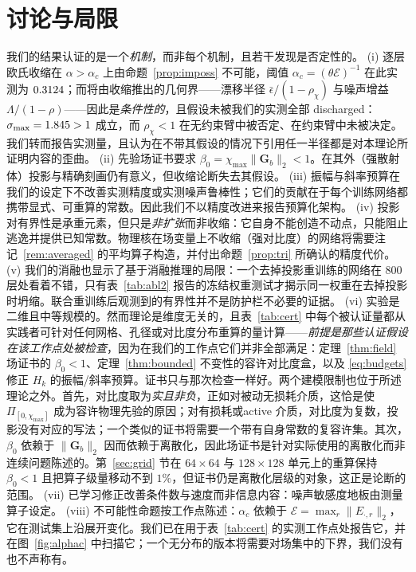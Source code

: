 \documentclass[UTF8,a4paper,11pt]{ctexart}
\newcommand{\norm}[1]{\lVert #1 \rVert}
\newcommand{\numv}[1]{#1}
\begin{document}
\section{讨论与局限}\label{sec:lim}
我们的结果认证的是一个\emph{机制}，而非每个机制，且若干发现是否定性的。
(i) 逐层欧氏收缩在 $\alpha>\alpha_c$ 上由命题~\ref{prop:imposs} 不可能，阈值 $\alpha_c=(\theta\mathcal{E})^{-1}$ 在此实测为 $\numv{\NumAlphaC}$；而将由收缩推出的几何界——漂移半径 $\bar\epsilon/(1-\rho_\chi)$ 与噪声增益 $\Lambda/(1-\rho)$——因此是\emph{条件性的}，且假设未被我们的实测全部 discharged：$\sigma_{\max}=\numv{\NumPhysSigma}>1$ 成立，而 $\rho_\chi<1$ 在无约束臂中被否定、在约束臂中未被决定。我们转而报告实测量，且认为在不带其假设的情况下引用任一半径都是对本理论所证明内容的歪曲。
(ii) 先验场证书要求 $\beta_0=\chi_{\max}\norm{\mathbf{G}_b}_2<1$。在其外（强散射体）投影与精确刻画仍有意义，但收缩论断失去其假设。
(iii) 振幅与斜率预算在我们的设定下不改善实测精度或实测噪声鲁棒性；它们的贡献在于每个训练网络都携带显式、可重算的常数。因此我们不以精度改进来报告预算化架构。
(iv) 投影对有界性是承重元素，但只是\emph{非扩张}而非收缩：它自身不能创造不动点，只能阻止逃逸并提供已知常数。物理核在场变量上不收缩（强对比度）的网络将需要注记~\ref{rem:averaged} 的平均算子构造，并付出命题~\ref{prop:tri} 所确认的精度代价。
(v) 我们的消融也显示了基于消融推理的局限：一个去掉投影重训练的网络在 $800$ 层处看着不错，只有表~\ref{tab:abl2} 报告的冻结权重测试才揭示同一权重在去掉投影时坍缩。联合重训练后观测到的有界性并不是防护栏不必要的证据。
(vi) 实验是二维且中等规模的。然而理论是维度无关的，且表~\ref{tab:cert} 中每个被认证量都从实践者可针对任何网格、孔径或对比度分布重算的量计算——\emph{前提是那些认证假设在该工作点处被检查}，因为在我们的工作点它们并非全部满足：定理~\ref{thm:field} 场证书的 $\beta_0<1$、定理~\ref{thm:bounded} 不变性的容许对比度盒，以及 \eqref{eq:budgets} 修正 $H_k$ 的振幅/斜率预算。证书只与那次检查一样好。两个建模限制也位于所述理论之外。首先，对比度取为\emph{实且非负}，正如对被动无损耗介质，这恰是使 $\Pi_{[0,\chi_{\max}]}$ 成为容许物理先验的原因；对有损耗或active 介质，对比度为复数，投影没有对应的写法；一个类似的证书将需要一个带有自身常数的复容许集。其次，$\beta_0$ 依赖于 $\norm{\mathbf{G}_b}_2$ 因而依赖于离散化，因此场证书是针对实际使用的离散化而非连续问题陈述的。第~\ref{sec:grid} 节在 $64\times64$ 与 $128\times128$ 单元上的重算保持 $\beta_0<1$ 且把算子级量移动不到 $1\%$，但证书仍是离散化层级的对象，这正是论断的范围。
(vii) 已学习修正改善条件数与速度而非信息内容：噪声敏感度地板由测量算子设定。
(viii) 不可能性命题按工作点陈述：$\alpha_c$ 依赖于 $\mathcal{E}=\max_r\norm{E_{\cdot,r}}_2$，它在测试集上沿展开变化。我们已在用于表~\ref{tab:cert} 的实测工作点处报告它，并在图~\ref{fig:alphac} 中扫描它；一个无分布的版本将需要对场集中的下界，我们没有也不声称有。
\end{document}
